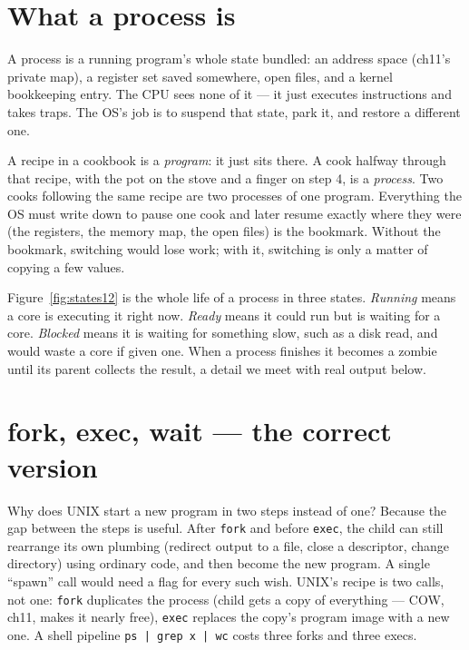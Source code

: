 \section{What a process is}
\label{sec:proc12}

A process is a running program's whole state bundled: an address
space (ch11's private map), a register set saved somewhere, open
files, and a kernel bookkeeping entry. The CPU sees none of it ---
it just executes instructions and takes traps. The OS's job is to
suspend that state, park it, and restore a different one.

\begin{principle}
A recipe in a cookbook is a \emph{program}: it just sits there. A cook
halfway through that recipe, with the pot on the stove and a finger
on step 4, is a \emph{process}. Two cooks following the same recipe
are two processes of one program. Everything the OS must write down
to pause one cook and later resume exactly where they were (the
registers, the memory map, the open files) is the bookmark. Without
the bookmark, switching would lose work; with it, switching is only
a matter of copying a few values.
\end{principle}

Figure~\ref{fig:states12} is the whole life of a process in three
states. \emph{Running} means a core is executing it right now.
\emph{Ready} means it could run but is waiting for a core.
\emph{Blocked} means it is waiting for something slow, such as a
disk read, and would waste a core if given one. When a process
finishes it becomes a zombie until its parent collects the result,
a detail we meet with real output below.



\section{fork, exec, wait --- the correct version}
\label{sec:few12}

Why does UNIX start a new program in two steps instead of one?
Because the gap between the steps is useful. After \texttt{fork}
and before \texttt{exec}, the child can still rearrange its own
plumbing (redirect output to a file, close a descriptor, change
directory) using ordinary code, and then become the new program.
A single ``spawn'' call would need a flag for every such wish.
UNIX's recipe is two calls, not one: \texttt{fork} duplicates the
process (child gets a copy of everything --- COW, ch11, makes it
nearly free), \texttt{exec} replaces the copy's program image with a
new one. A shell pipeline \texttt{ps | grep x | wc} costs three
forks and three execs.

